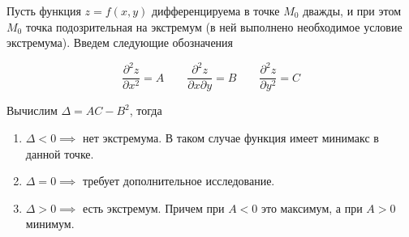 \begin{theorem}
  Пусть функция \(z = f(x, y)\) дифференцируема в точке \(M_0\) дважды, и при
  этом \(M_0\) точка подозрительная на экстремум (в ней выполнено необходимое
  условие экстремума). Введем следующие обозначения

  \begin{equation*}
    \frac{\partial^2 z}{\partial x^2} = A
    \qquad
    \frac{\partial^2 z}{\partial x \partial y} = B
    \qquad
    \frac{\partial^2 z}{\partial y^2} = C
  \end{equation*}

  Вычислим \(\Delta = A C - B^2\), тогда

  \begin{enumerate}
  \item
    \(\Delta < 0 \implies\) нет экстремума. В таком случае функция имеет
    минимакс в данной точке.
  
  \item
    \(\Delta = 0 \implies\) требует дополнительное исследование.
  
  \item
    \(\Delta > 0 \implies\) есть экстремум. Причем при \(A < 0\) это максимум, а
    при \(A > 0\) минимум.
  \end{enumerate}
\end{theorem}


